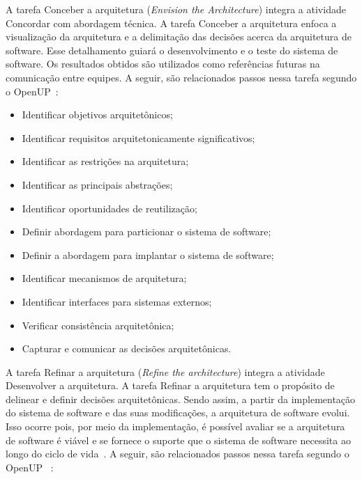 %


A tarefa Conceber a arquitetura (\emph{Envision the Architecture}) integra a atividade Concordar com abordagem técnica. A tarefa Conceber a arquitetura enfoca a visualização da arquitetura e a delimitação das decisões acerca da arquitetura de software. Esse detalhamento guiará o desenvolvimento e o teste do sistema de software. Os resultados obtidos são utilizados como referências futuras na comunicação entre equipes. A seguir, são relacionados passos nessa tarefa segundo o OpenUP~\cite{openup}:

\begin{itemize}
    \item Identificar objetivos arquitetônicos;
    \item Identificar requisitos arquitetonicamente significativos;
    \item Identificar as restrições na arquitetura;
    \item Identificar as principais abstrações;
    \item Identificar oportunidades de reutilização;
    \item Definir abordagem para particionar o sistema de software;
    \item Definir a abordagem para implantar o sistema de software;
    \item Identificar mecanismos de arquitetura;
    \item Identificar interfaces para sistemas externos;
    \item Verificar consistência arquitetônica;
    \item Capturar e comunicar as decisões arquitetônicas.
\end{itemize}

A tarefa Refinar a arquitetura (\emph{Refine the architecture}) integra a atividade Desenvolver a arquitetura. A tarefa Refinar a arquitetura tem o propósito de delinear e definir decisões arquitetônicas. Sendo assim, a partir da implementação do sistema de software e das suas modificações, a arquitetura de software evolui. Isso ocorre pois, por meio da implementação, é possível avaliar se a arquitetura de software é viável e se fornece o suporte que o sistema de software necessita ao longo do ciclo de vida~\cite{openup}. A seguir, são relacionados passos nessa tarefa segundo o OpenUP ~\cite{openup}:

